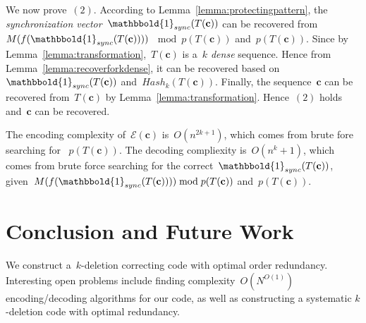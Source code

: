 \documentclass[10pt,a4paper,onecolumn]{IEEEtran}
\newcommand{\1}{\mathbbold{1}}
\newcommand{\boldc}{\mathbf{c}}
\begin{document}
We now prove~$(2)$. According to Lemma~\ref{lemma:protectingpattern}, the \emph{synchronization vector}~$\1_{sync}(T(\boldc))$ can be recovered from~$M(f(\1_{sync}(T(\boldc)))) $ $\bmod p(T(\boldc))$ and~$p(T(\boldc))$. Since by Lemma~\ref{lemma:transformation},~$T(\boldc)$ is a~\emph{$k$ dense} sequence. Hence from Lemma~\ref{lemma:recoverforkdense}, it can be recovered based on~$\1_{sync}(T(\boldc))$ and~$Hash_k(T(\boldc))$. Finally, the sequence~$\boldc$
can be recovered from~$T(\boldc)$ by Lemma~\ref{lemma:transformation}. Hence~$(2)$ holds and~$\boldc$ can be recovered.



The encoding complexity of~$\mathcal{E}(\boldc)$ is~$O(n^{2k+1})$, which comes from brute fore searching for ~$p(T(\boldc))$. The decoding compliexity is~$O(n^k+1)$, which comes from brute force searching for the correct~$\1_{sync}(T(\boldc))$, given~$M(f(\1_{sync}(T(\boldc)))) \bmod p(T(\boldc))$ and~$p(T(\boldc))$. 


\section{Conclusion and Future Work}\label{section:conclusion}
We construct a~$k$-deletion correcting code with optimal order redundancy.  
Interesting open problems include finding complexity~$O(N^{O(1)})$ encoding/decoding algorithms for our code, as well as constructing a systematic $k$-deletion code with optimal redundancy.
\end{document}
